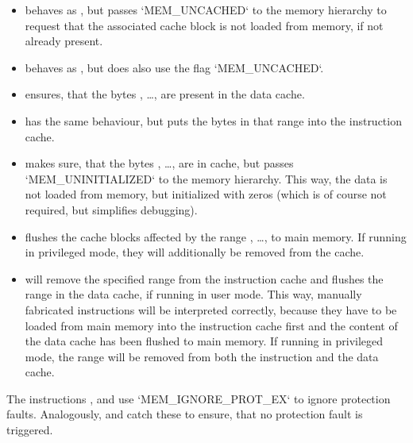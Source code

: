 \begin{itemize}
	\item {} behaves as , but passes `MEM_UNCACHED` to the memory hierarchy to request that the associated cache block is not loaded from memory, if not already present.
	\item {} behaves as , but does also use the flag `MEM_UNCACHED`.
	\item {} ensures, that the bytes , \dots,  are present in the data cache.
	\item {} has the same behaviour, but puts the bytes in that range into the instruction cache.
	\item {} makes sure, that the bytes , \dots,  are in cache, but passes `MEM_UNINITIALIZED` to the memory hierarchy. This way, the data is not loaded from memory, but initialized with zeros (which is of course not required, but simplifies debugging).
	\item {} flushes the cache blocks affected by the range , \dots,  to main memory. If running in privileged mode, they will additionally be removed from the cache.
	\item {} will remove the specified range from the instruction cache and flushes the range in the data cache, if running in user mode. This way, manually fabricated instructions will be interpreted correctly, because they have to be loaded from main memory into the instruction cache first and the content of the data cache has been flushed to main memory. If running in privileged mode, the range will be removed from both the instruction and the data cache.
\end{itemize}
The instructions ,  and  use `MEM_IGNORE_PROT_EX` to ignore protection faults. Analogously,  and  catch these  to ensure, that no protection fault is triggered.

